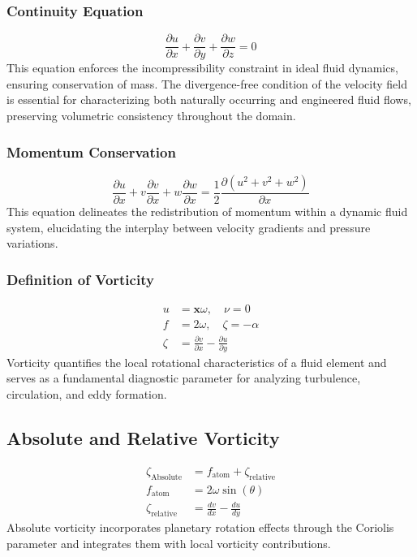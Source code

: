 \documentclass[a4paper,10pt]{article}
\begin{document}
    \subsubsection*{Continuity Equation}
    \begin{equation*}
        \frac{\partial u}{\partial x} + \frac{\partial v}{\partial y} + \frac{\partial w}{\partial z} = 0
    \end{equation*}
    This equation enforces the incompressibility constraint in ideal fluid dynamics, ensuring conservation of mass. The divergence-free condition of the velocity field is essential for characterizing both naturally occurring and engineered fluid flows, preserving volumetric consistency throughout the domain.

    \subsubsection*{Momentum Conservation}
    \begin{equation*}
        \frac{\partial u}{\partial x} + v \frac{\partial v}{\partial x} + w \frac{\partial w}{\partial x} = \frac{1}{2} \frac{\partial (u^2 + v^2 + w^2)}{\partial x}
    \end{equation*}
    This equation delineates the redistribution of momentum within a dynamic fluid system, elucidating the interplay between velocity gradients and pressure variations.

    \subsubsection*{Definition of Vorticity}
    \begin{align}
        u &= \boldsymbol{x} \omega, \quad \nu=0 \\
        f &= 2 \omega, \quad \zeta=-\alpha \\
        \zeta &= \frac{\partial v}{\partial x} - \frac{\partial u}{\partial y}
    \end{align}
    Vorticity quantifies the local rotational characteristics of a fluid element and serves as a fundamental diagnostic parameter for analyzing turbulence, circulation, and eddy formation.

    \subsection*{Absolute and Relative Vorticity}
    \begin{align}
        \zeta_\text{Absolute} &= f_\text{atom} + \zeta_\text{relative} \\
        f_\text{atom} &= 2 \omega \sin(\theta) \\
        \zeta_{\text {relative }} &=\frac{d v}{d x}-\frac{d u}{d y}
    \end{align}
    Absolute vorticity incorporates planetary rotation effects through the Coriolis parameter and integrates them with local vorticity contributions.
\end{document}
